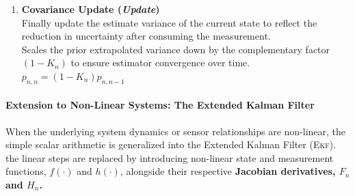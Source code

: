 \begin{enumerate}[label=\textbf{Step \arabic*:}, leftmargin=*, itemsep=1em]
	\item \textbf{Covariance Update (\emph{Update})}\\
	Finally update the estimate variance of the current state to reflect the reduction in uncertainty after consuming the measurement.%
	\\
	Scales the prior extrapolated variance down by the complementary factor $(1 - K_n)$ to ensure estimator convergence over time.\\
	$p_{n,n} = (1 - K_n)p_{n,n-1}$
	
\end{enumerate}


\paragraph{Extension to Non-Linear Systems: The Extended Kalman Filter}
\label{sec:extended_kalman_filter}

When the underlying system dynamics or sensor relationships are non-linear, the simple scalar arithmetic is generalized into the Extended Kalman Filter (\textsc{Ekf}).%
the linear steps are replaced by introducing non-linear state and measurement functions, $f(\cdot)$ and $h(\cdot)$, alongside their respective \textbf{Jacobian derivatives, $F_n$ and $H_n$.}



